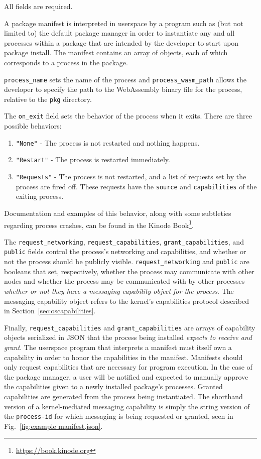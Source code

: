 \documentclass[runningheads]{llncs}
\begin{document}
All fields are required.

A package manifest is interpreted in userspace by a program such as (but not limited to) the default package manager in order to instantiate any and all processes within a package that are intended by the developer to start upon package install.
The manifest contains an array of objects, each of which corresponds to a process in the package.

\verb|process_name| sets the name of the process and \verb|process_wasm_path| allows the developer to specify the path to the WebAssembly binary file for the process, relative to the \verb|pkg| directory.

The \verb|on_exit| field sets the behavior of the process when it exits. There are three possible behaviors:
\begin{enumerate}
    \item \verb|"None"| - The process is not restarted and nothing happens.
	\item \verb|"Restart"| - The process is restarted immediately.
	\item \verb|"Requests"| - The process is not restarted, and a list of requests set by the process are fired off. These requests have the \verb|source| and \verb|capabilities| of the exiting process.
\end{enumerate}

Documentation and examples of this behavior, along with some subtleties regarding process crashes, can be found in the Kinode Book\footnote{\url{https://book.kinode.org}}.

The \verb|request_networking|, \verb|request_capabilities|, \verb|grant_capabilities|, and \verb|public| fields control the process's networking and capabilities, and whether or not the process should be publicly visible.
\verb|request_networking| and \verb|public| are booleans that set, respectively, whether the process may communicate with other nodes and whether the process may be communicated with by other processes \textit{whether or not they have a messaging capability object for the process}.
The messaging capability object refers to the kernel's capabilities protocol described in Section~\ref{sec:oscapabilities}.

Finally, \verb|request_capabilities| and \verb|grant_capabilities| are arrays of capability objects serialized in JSON that the process being installed \textit{expects to receive and grant}.
The userspace program that interprets a manifest must itself own a capability in order to honor the capabilities in the manifest.
Manifests should only request capabilities that are necessary for program execution.
In the case of the package manager, a user will be notified and expected to manually approve the capabilities given to a newly installed package's processes.
Granted capabilities are generated from the process being instantiated.
The shorthand version of a kernel-mediated messaging capability is simply the string version of the \verb|process-id| for which messaging is being requested or granted, seen in Fig.~\ref{fig:example manifest.json}.
\end{document}
